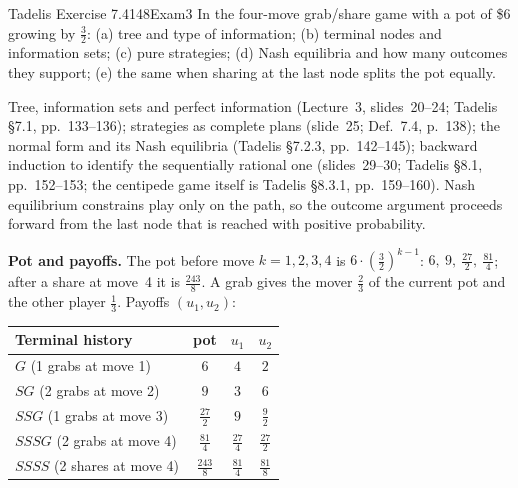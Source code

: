 \begin{exsol}{Tadelis Exercise 7.4}{148}{Exam}{3}
\asked In the four-move grab/share game with a pot of \$6 growing by $\frac32$: (a) tree and type
of information; (b) terminal nodes and information sets; (c) pure strategies; (d) Nash equilibria
and how many outcomes they support; (e) the same when sharing at the last node splits the pot
equally.

\method Tree, information sets and perfect information (Lecture~3, slides~20--24; Tadelis
\S7.1, pp.~133--136); strategies as complete plans (slide~25; Def.~7.4, p.~138); the normal form
and its Nash equilibria (Tadelis \S7.2.3, pp.~142--145); backward induction to identify the
sequentially rational one (slides~29--30; Tadelis \S8.1, pp.~152--153; the centipede game itself is
Tadelis \S8.3.1, pp.~159--160). Nash equilibrium constrains play only on the path, so the outcome
argument proceeds forward from the last node that is reached with positive probability.

\solution
\textbf{Pot and payoffs.} The pot before move $k = 1, 2, 3, 4$ is $6 \cdot (\frac32)^{k-1}$:
$6,\ 9,\ \frac{27}{2},\ \frac{81}{4}$; after a share at move~4 it is $\frac{243}{8}$. A grab gives
the mover $\frac23$ of the current pot and the other player $\frac13$. Payoffs $(u_1,u_2)$:
\begin{center}
\begin{tabular}{lccc}
\toprule
Terminal history & pot & $u_1$ & $u_2$ \\
\midrule
$G$ (1 grabs at move 1) & $6$ & $4$ & $2$ \\
$SG$ (2 grabs at move 2) & $9$ & $3$ & $6$ \\
$SSG$ (1 grabs at move 3) & $\frac{27}{2}$ & $9$ & $\frac92$ \\
$SSSG$ (2 grabs at move 4) & $\frac{81}{4}$ & $\frac{27}{4}$ & $\frac{27}{2}$ \\
$SSSS$ (2 shares at move 4) & $\frac{243}{8}$ & $\frac{81}{4}$ & $\frac{81}{8}$ \\
\bottomrule
\end{tabular}
\end{center}


\end{exsol}

